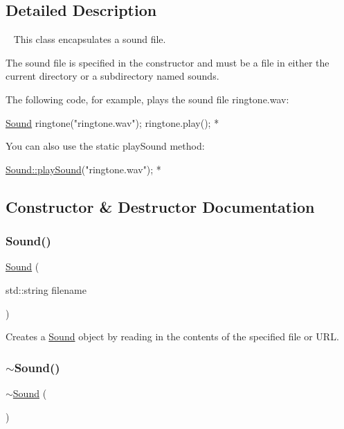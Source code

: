 \subsection{Detailed Description}
~\newline
 This class encapsulates a sound file. 

The sound file is specified in the constructor and must be a file in either the current directory or a subdirectory named {\ttfamily sounds}.

The following code, for example, plays the sound file {\ttfamily ringtone.\+wav}\+:


\begin{DoxyPre}
     \mbox{\hyperlink{classSound}{Sound}} ringtone("ringtone.wav");
     ringtone.play();
*\end{DoxyPre}


You can also use the static {\ttfamily play\+Sound} method\+:


\begin{DoxyPre}
     \mbox{\hyperlink{classSound_a33b24517799bad56a19cfe26b3f962ae}{Sound::playSound}}("ringtone.wav");
*\end{DoxyPre}
 

\subsection{Constructor \& Destructor Documentation}
\mbox{\label{classSound_abc4f1c2a277d6731194905a54294c7ba}} 
\subsubsection{\texorpdfstring{Sound()}{Sound()}}
{\footnotesize\ttfamily \mbox{\hyperlink{classSound}{Sound}} (\begin{DoxyParamCaption}\item[{std\+::string}]{filename }\end{DoxyParamCaption})}



Creates a {\ttfamily \mbox{\hyperlink{classSound}{Sound}}} object by reading in the contents of the specified file or U\+RL. 

\mbox{\label{classSound_ac34f0a5b7e2e11c053df62714aff04fa}} 
\subsubsection{\texorpdfstring{$\sim$\+Sound()}{~Sound()}}
{\footnotesize\ttfamily $\sim$\mbox{\hyperlink{classSound}{Sound}} (\begin{DoxyParamCaption}{ }\end{DoxyParamCaption})\hspace{0.3cm}{\ttfamily [virtual]}}




